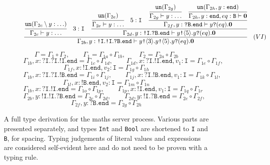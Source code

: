 \documentclass{l4proj}
\begin{document}
\begin{figure}[H]
\begin{subfigure}{\textwidth}
\[\cfrac{\cfrac{\texttt{un}(\Gamma_{2c} \setminus y : \ldots)}{\Gamma_{2c} \vdash y : \ldots} \quad 3 : \texttt{I} \quad \cfrac{\cfrac{\texttt{un}(\Gamma_{2e})}{\Gamma_{2e}  \vdash y : \ldots} \quad 5 : \texttt{I} \quad \cfrac{\cfrac{\texttt{un}(\Gamma_{2g})}{\Gamma_{2g} \vdash y : \ldots} \quad \cfrac{\texttt{un}(\Gamma_{2h}, y : \texttt{end})}{\Gamma_{2h}, y : \texttt{end}, eq : \texttt{B} \vdash \textbf{0}} }{\Gamma_{2f}, y : \texttt{?B}.\texttt{end} \vdash y\texttt{?}(eq).\textbf{0}}}{\Gamma_{2d}, y : \texttt{!I}.\texttt{?B}.\texttt{end} \vdash y\texttt{!} \langle 5 \rangle .y\texttt{?}(eq).\textbf{0}}}{\Gamma_{2b}, y : \texttt{!I}.\texttt{!I}.\texttt{?B}.\texttt{end} \vdash y\texttt{!} \langle 3 \rangle .y\texttt{!} \langle 5 \rangle .y\texttt{?}(eq).\textbf{0}} \quad \displaystyle{(VI)}\]
\vspace{\fill}
\end{subfigure}

\begin{subfigure}{\textwidth}
\[\Gamma = \Gamma_{1} \circ \Gamma_{2}, \qquad \Gamma_{1} = \Gamma_{1a} \circ \Gamma_{1b}, \qquad 
\Gamma_{2} = \Gamma_{2a} \circ \Gamma_{2b}\]
\[\Gamma_{1b}, x : \texttt{?I}.\texttt{?I}.\texttt{!I}.\texttt{end} = \Gamma_{1c} \circ \Gamma_{1d}, \qquad \Gamma_{1d}, x : \texttt{?I}.\texttt{!I}.\texttt{end}, v_{1} : \texttt{I} = \Gamma_{1e} \circ \Gamma_{1f}, \]
\[\Gamma_{1f}, x : \texttt{!I}.\texttt{end}, v_{2} : \texttt{I} = \Gamma_{1g} \circ \Gamma_{1h} \]
\[\Gamma_{1b}, x : \texttt{?I}.\texttt{?I}.\texttt{!B}.\texttt{end} = \Gamma_{1i} \circ \Gamma_{1j}, \qquad \Gamma_{1j}, x : \texttt{?I}.\texttt{!B}.\texttt{end}, v_{1} : \texttt{I} = \Gamma_{1k} \circ \Gamma_{1l}, \]
\[\Gamma_{1l}, x : \texttt{!B}.\texttt{end}, v_{2} : \texttt{I} = \Gamma_{1m} \circ \Gamma_{1n} \] 
\[\Gamma_{1b}, x : \texttt{?I}.\texttt{!I}.\texttt{end} = \Gamma_{1o} \circ \Gamma_{1p}, \qquad
\Gamma_{1p}, x : \texttt{!I}.\texttt{end}, v_{1} : \texttt{I} = \Gamma_{1q} \circ \Gamma_{1r} \] \[\Gamma_{2b}, y : \texttt{!I}.\texttt{!I}.\texttt{?B}.\texttt{end} = \Gamma_{2c} \circ \Gamma_{2d}, \qquad  \Gamma_{2d}, y : \texttt{!I}.\texttt{?B}.\texttt{end} = \Gamma_{2e} \circ \Gamma_{2f}, \]
\[\Gamma_{2f}, y : \texttt{?B}.\texttt{end} = \Gamma_{2g} \circ \Gamma_{2h}\]
\end{subfigure}
\caption{A full type derivation for the maths server process. Various parts are presented separately, and types \texttt{Int} and \texttt{Bool} are shortened to \texttt{I} and \texttt{B}, for spacing. Typing judgements of literal values and expressions are considered self-evident here and do not need to be proven with a typing rule.}
\label{fig:exampleType}
\end{figure}
\end{document}
